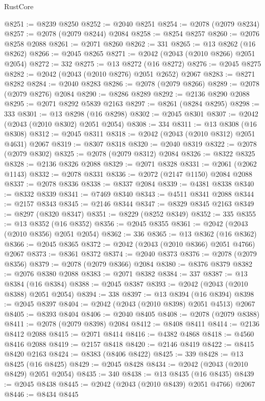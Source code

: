 \begin{lexlean}{RustCore}
\begin{coremodule}
@8251 := @8239 @8250
@8252 := @2040 @8251
@8254 := @2078 (@2079 @8234)
@8257 := @2078 (@2079 @8244) @2084
@8258 := @8254 @8257
@8260 := @2076 @8258 @2088
@8261 := @2071 @8260
@8262 := 331
@8265 := @13 @8262 (@16 @8262)
@8266 := @2045 @8265
@8271 := @2042 (@2043 (@2010 @8266) @2051 @2054)
@8272 := 332
@8275 := @13 @8272 (@16 @8272)
@8276 := @2045 @8275
@8282 := @2042 (@2043 (@2010 @8276) @2051 @2652) @2067
@8283 := @8271 @8282
@8284 := @2040 @8283
@8286 := @2078 (@2079 @8266)
@8289 := @2078 (@2079 @8276) @2084
@8290 := @8286 @8289
@8292 := @2136 @8290 @2088
@8295 := @2071 @8292 @5839 @2163
@8297 := @8261 (@8284 @8295)
@8298 := 333
@8301 := @13 @8298 (@16 @8298)
@8302 := @2045 @8301
@8307 := @2042 (@2043 (@2010 @8302) @2051 @2054)
@8308 := 334
@8311 := @13 @8308 (@16 @8308)
@8312 := @2045 @8311
@8318 := @2042 (@2043 (@2010 @8312) @2051 @4631) @2067
@8319 := @8307 @8318
@8320 := @2040 @8319
@8322 := @2078 (@2079 @8302)
@8325 := @2078 (@2079 @8312) @2084
@8326 := @8322 @8325
@8328 := @2136 @8326 @2088
@8329 := @2071 @8328
@8331 := @2061 (@2062 @1143)
@8332 := @2078 @8331
@8336 := @2072 (@2147 @1150) @2084 @2088
@8337 := @2078 @8336
@8338 := @8337 @2084
@8339 := @4381 @8338
@8340 := @8332 @8339
@8341 := @7469 @8340
@8343 := @4511 @8341 @2088
@8344 := @2157 @8343
@8345 := @2146 @8344
@8347 := @8329 @8345 @2163
@8349 := @8297 (@8320 @8347)
@8351 := @8229 (@8252 @8349)
@8352 := 335
@8355 := @13 @8352 (@16 @8352)
@8356 := @2045 @8355
@8361 := @2042 (@2043 (@2010 @8356) @2051 @2054)
@8362 := 336
@8365 := @13 @8362 (@16 @8362)
@8366 := @2045 @8365
@8372 := @2042 (@2043 (@2010 @8366) @2051 @4766) @2067
@8373 := @8361 @8372
@8374 := @2040 @8373
@8376 := @2078 (@2079 @8356)
@8379 := @2078 (@2079 @8366) @2084
@8380 := @8376 @8379
@8382 := @2076 @8380 @2088
@8383 := @2071 @8382
@8384 := 337
@8387 := @13 @8384 (@16 @8384)
@8388 := @2045 @8387
@8393 := @2042 (@2043 (@2010 @8388) @2051 @2054)
@8394 := 338
@8397 := @13 @8394 (@16 @8394)
@8398 := @2045 @8397
@8404 := @2042 (@2043 (@2010 @8398) @2051 @4513) @2067
@8405 := @8393 @8404
@8406 := @2040 @8405
@8408 := @2078 (@2079 @8388)
@8411 := @2078 (@2079 @8398) @2084
@8412 := @8408 @8411
@8414 := @2136 @8412 @2088
@8415 := @2071 @8414
@8416 := @4382 @4868
@8418 := @4560 @8416 @2088
@8419 := @2157 @8418
@8420 := @2146 @8419
@8422 := @8415 @8420 @2163
@8424 := @8383 (@8406 @8422)
@8425 := 339
@8428 := @13 @8425 (@16 @8425)
@8429 := @2045 @8428
@8434 := @2042 (@2043 (@2010 @8429) @2051 @2054)
@8435 := 340
@8438 := @13 @8435 (@16 @8435)
@8439 := @2045 @8438
@8445 := @2042 (@2043 (@2010 @8439) @2051 @4766) @2067
@8446 := @8434 @8445

\end{coremodule}
\end{lexlean}
